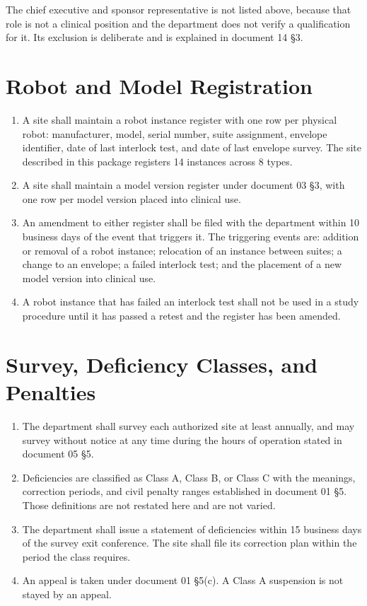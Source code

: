 The chief executive and sponsor representative is not listed above, because that
role is not a clinical position and the department does not verify a
qualification for it. Its exclusion is deliberate and is explained in document
14 §3.

\section{Robot and Model Registration}

\begin{enumerate}
\item A site shall maintain a robot instance register with one row per physical
  robot: manufacturer, model, serial number, suite assignment, envelope
  identifier, date of last interlock test, and date of last envelope survey. The
  site described in this package registers 14 instances across 8 types.

\item A site shall maintain a model version register under document 03 §3, with
  one row per model version placed into clinical use.

\item An amendment to either register shall be filed with the department within
  10 business days of the event that triggers it. The triggering events are:
  addition or removal of a robot instance; relocation of an instance between
  suites; a change to an envelope; a failed interlock test; and the placement of
  a new model version into clinical use.

\item A robot instance that has failed an interlock test shall not be used in a
  study procedure until it has passed a retest and the register has been
  amended.
\end{enumerate}

\section{Survey, Deficiency Classes, and Penalties}

\begin{enumerate}
\item The department shall survey each authorized site at least annually, and
  may survey without notice at any time during the hours of operation stated in
  document 05 §5.

\item Deficiencies are classified as Class A, Class B, or Class C with the
  meanings, correction periods, and civil penalty ranges established in document
  01 §5. Those definitions are not restated here and are not varied.

\item The department shall issue a statement of deficiencies within 15 business
  days of the survey exit conference. The site shall file its correction plan
  within the period the class requires.

\item An appeal is taken under document 01 §5(c). A Class A suspension is not
  stayed by an appeal.
\end{enumerate}

